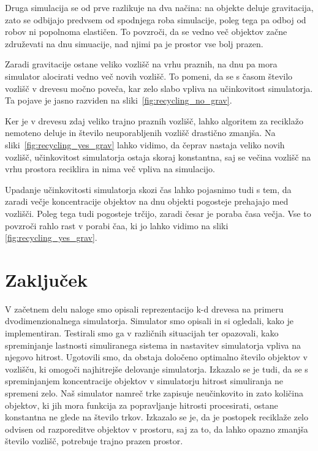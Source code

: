 \documentclass[a4paper,12pt]{article}
\begin{document}
Druga simulacija se od prve razlikuje na dva načina: na objekte deluje gravitacija, zato se odbijajo predvsem od spodnjega
roba simulacije, poleg tega pa odboj od robov ni popolnoma elastičen. To povzroči, da se vedno več objektov začne združevati
na dnu simuacije, nad njimi pa je prostor vse bolj prazen.

Zaradi gravitacije ostane veliko vozlišč na vrhu praznih, na dnu pa mora simulator alocirati vedno več novih vozlišč.
To pomeni, da se s časom število vozlišč v drevesu močno poveča, kar zelo slabo vpliva na učinkovitost simulatorja.
Ta pojave je jasno razviden na sliki~\ref{fig:recycling_no_grav}.

Ker je v drevesu zdaj veliko trajno praznih vozlišč, lahko algoritem za reciklažo nemoteno deluje in število neuporabljenih
vozlišč drastično zmanjša. Na sliki~\ref{fig:recycling_yes_grav} lahko vidimo, da čeprav nastaja veliko novih vozlišč, 
učinkovitost simulatorja ostaja skoraj konstantna, saj se večina vozlišč na vrhu prostora reciklira in nima več vpliva
na simulacijo.

Upadanje učinkovitosti simulatorja skozi čas lahko pojasnimo tudi s tem, da zaradi večje koncentracije objektov na dnu
objekti pogosteje prehajajo med vozlišči. Poleg tega tudi pogosteje trčijo, zaradi česar je poraba časa večja.
Vse to povzroči rahlo rast v porabi čaa, ki jo lahko vidimo na sliki \ref{fig:recycling_yes_grav}.
\clearpage
\section{Zaključek}
V začetnem delu naloge smo opisali reprezentacijo k-d drevesa na primeru dvodimenzionalnega simulatorja.
Simulator smo opisali in si ogledali, kako je implementiran. Testirali smo ga v različnih situacijah
ter opazovali, kako spreminjanje lastnosti simuliranega sistema in nastavitev simulatorja vpliva na
njegovo hitrost. Ugotovili smo, da obstaja določeno optimalno število objektov v vozlišču, ki omogoči
najhitrejše delovanje simulatorja. Izkazalo se je tudi, da se s spreminjanjem koncentracije objektov v
simulatorju hitrost simuliranja ne spremeni zelo. Naš simulator namreč trke zapisuje neučinkovito
in zato količina objektov, ki jih mora funkcija za popravljanje hitrosti procesirati, ostane konstantna
ne glede na število trkov. Izkazalo se je, da je postopek reciklaže  zelo odvisen od razporeditve objektov
v prostoru, saj za to, da lahko opazno zmanjša število vozlišč, potrebuje trajno prazen prostor.

\clearpage
\lstlistoflistings{}
\listoffigures{}
\newpage


\end{document}
